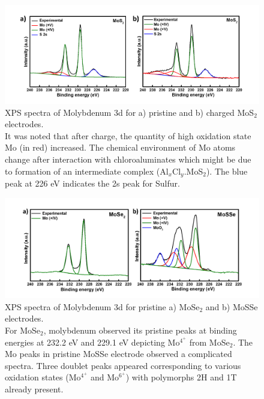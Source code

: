 \documentclass[num-refs]{wiley-article}
\begin{document}
\begin{figure}[h!]
\centering
\includegraphics[width=\textwidth]{SF/SF2}
\caption{XPS spectra of Molybdenum 3d for a) pristine and b) charged MoS$_2$ electrodes.\\It was noted that after charge, the quantity of high oxidation state Mo (in red) increased. The chemical environment of Mo atoms change after interaction with chloroaluminates which might be due to formation of an intermediate complex (Al$_x$Cl$_y$.MoS$_2$). The blue peak at 226 eV indicates the 2s peak for Sulfur.}
\end{figure}

\begin{figure}[h!]
\centering
\includegraphics[width=\textwidth]{SF/SF3}
\caption{XPS spectra of Molybdenum 3d for pristine a) MoSe$_2$ and b) MoSSe electrodes.\\For MoSe$_2$, molybdenum observed its pristine peaks at binding energies at 232.2 eV and 229.1 eV depicting Mo$^4^+$ from MoSe$_2$. The Mo peaks in pristine MoSSe electrode observed a complicated spectra. Three doublet peaks appeared corresponding to various oxidation states (Mo$^4^+$ and Mo$^6^+$) with polymorphs 2H and 1T already present. }
\end{figure}
\end{document}

